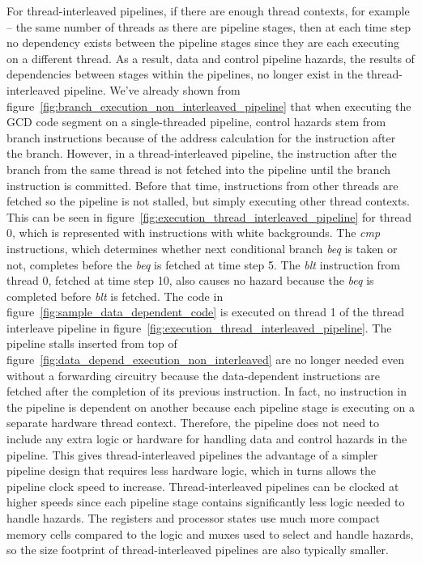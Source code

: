 For thread-interleaved pipelines, if there are enough thread contexts, for example -- the same number of threads as there are pipeline stages, then at each time step no dependency exists between the pipeline stages since they are each executing on a different thread. 
As a result, data and control pipeline hazards, the results of dependencies between stages within the pipelines, no longer exist in the thread-interleaved pipeline.    
We've already shown from figure~\ref{fig:branch_execution_non_interleaved_pipeline} that when executing the GCD code segment on a single-threaded pipeline, control hazards stem from branch instructions because of the address calculation for the instruction after the branch.
However, in a thread-interleaved pipeline, the instruction after the branch from the same thread is not fetched into the pipeline until the branch instruction is committed.
Before that time, instructions from other threads are fetched so the pipeline is not stalled, but simply executing other thread contexts.
This can be seen in figure~\ref{fig:execution_thread_interleaved_pipeline} for thread 0, which is represented with instructions with white backgrounds.
The \emph{cmp} instructions, which determines whether next conditional branch \emph{beq} is taken or not, completes before the \emph{beq} is fetched at time step 5.
The \emph{blt} instruction from thread 0, fetched at time step 10, also causes no hazard because the \emph{beq} is completed before \emph{blt} is fetched.
The code in figure~\ref{fig:sample_data_dependent_code} is executed on thread 1 of the thread interleave pipeline in figure~\ref{fig:execution_thread_interleaved_pipeline}.
The pipeline stalls inserted from top of figure~\ref{fig:data_depend_execution_non_interleaved} are no longer needed even without a forwarding circuitry because the data-dependent instructions are fetched after the completion of its previous instruction.
In fact, no instruction in the pipeline is dependent on another because each pipeline stage is executing on a separate hardware thread context.
Therefore, the pipeline does not need to include any extra logic or hardware for handling data and control hazards in the pipeline. 
This gives thread-interleaved pipelines the advantage of a simpler pipeline design that requires less hardware logic, which in turns allows the pipeline clock speed to increase.
Thread-interleaved pipelines can be clocked at higher speeds since each pipeline stage contains significantly less logic needed to handle hazards.
The registers and processor states use much more compact memory cells compared to the logic and muxes used to select and handle hazards, so the size footprint of thread-interleaved pipelines are also typically smaller.


